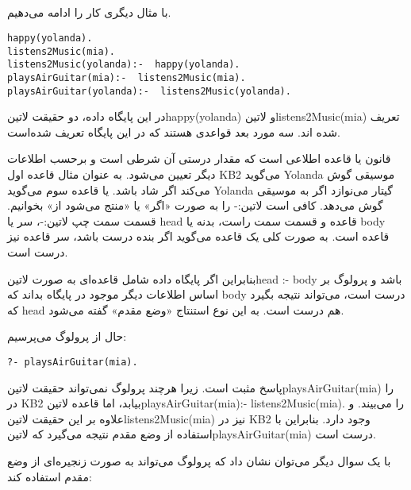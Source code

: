 \subsection{}
با مثال دیگری کار را ادامه می‌دهیم.

\begin{latin}
\begin{lstlisting}[title=KB2]
happy(yolanda). 
listens2Music(mia). 
listens2Music(yolanda):-  happy(yolanda). 
playsAirGuitar(mia):-  listens2Music(mia). 
playsAirGuitar(yolanda):-  listens2Music(yolanda).
\end{lstlisting}
\end{latin}

در این پایگاه داده، دو حقیقت ‌لاتین{happy(yolanda)} و ‌لاتین{listens2Music(mia)} تعریف شده اند. سه مورد بعد قواعدی هستند که در این پایگاه تعریف شده‌است.

قانون یا قاعده اطلاعی است که مقدار درستی آن شرطی است و برحسب اطلاعات دیگر تعیین می‌شود. به عنوان مثال قاعده اول KB2 می‌گوید Yolanda موسیقی گوش می‌کند اگر شاد باشد. یا قاعده سوم می‌گوید Yolanda گیتار می‌نوازد اگر به موسیقی گوش می‌دهد. کافی است ‌لاتین{:-} را به صورت «اگر» یا «منتج می‌شود از» بخوانیم. قسمت سمت چپ ‌لاتین{:-}، سر یا head قاعده و قسمت سمت راست، بدنه یا body قاعده است. به صورت کلی یک قاعده می‌گوید اگر بنده درست باشد، سر قاعده نیز درست است.

بنابراین اگر پایگاه داده شامل قاعده‌ای به صورت ‌لاتین{head :- body} باشد و پرولوگ بر اساس اطلاعات دیگر موجود در پایگاه بداند که body درست است، می‌تواند نتیجه بگیرد که head هم درست است. به این نوع استنتاج «وضع مقدم» گفته می‌شود.

حال از پرولوگ می‌پرسیم:

\begin{latin}
\begin{lstlisting}
?- playsAirGuitar(mia).
\end{lstlisting}
\end{latin}

پاسخ مثبت است. زیرا هرچند پرولوگ نمی‌تواند حقیقت ‌لاتین{playsAirGuitar(mia)} را در KB2 بیابد، اما قاعده ‌لاتین{playsAirGuitar(mia):-  listens2Music(mia).} را می‌بیند. و علاوه بر این حقیقت ‌لاتین{listens2Music(mia)} نیز در KB2 وجود دارد. بنابراین با استفاده از وضع مقدم نتیجه می‌گیرد که ‌لاتین{playsAirGuitar(mia)} درست است.

با یک سوال دیگر می‌توان نشان داد که پرولوگ می‌تواند به صورت زنجیره‌ای از وضع مقدم استفاده کند:

